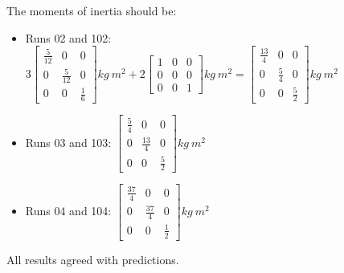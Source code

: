 \begin{description}
The moments of inertia should be:
\begin{itemize}
 \item Runs 02 and 102:  $3\begin{bmatrix} \frac{5}{12} & 0 & 0 \\ 0 &
 \frac{5}{12} & 0 \\ 0 & 0 & \frac{1}{6} \end{bmatrix} kg ~ m^2 +
 2\begin{bmatrix} 1 & 0 & 0 \\ 0 & 0 & 0 \\ 0 & 0 & 1 \end{bmatrix}kg ~ m^2  =
 \begin{bmatrix} \frac{13}{4} & 0 & 0 \\ 0 & \frac{5}{4} & 0 \\ 0 & 0 &
 \frac{5}{2} \end{bmatrix}kg ~ m^2$
 \item Runs 03 and 103:  $\begin{bmatrix} \frac{5}{4} & 0 & 0 \\ 0 &
 \frac{13}{4} & 0 \\ 0 & 0 & \frac{5}{2} \end{bmatrix}kg ~ m^2$
 \item Runs 04 and 104:  $\begin{bmatrix} \frac{37}{4} & 0 & 0 \\ 0 &
 \frac{37}{4} & 0 \\ 0 & 0 & \frac{1}{2} \end{bmatrix}kg ~ m^2$
\end{itemize}


All results agreed with predictions.
\end{description}




